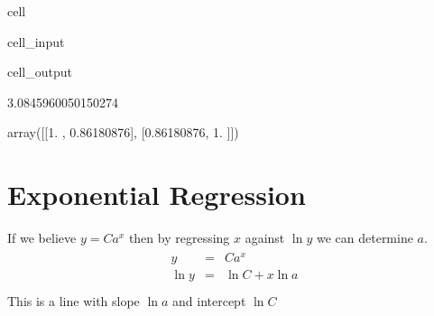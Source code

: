 \documentclass[letterpaper,10pt,english]{jupyterBook}
\begin{document}
\begin{sphinxuseclass}{cell}\begin{sphinxVerbatimInput}

\begin{sphinxuseclass}{cell_input}
\begin{sphinxVerbatim}[commandchars=\\\{\}]
\end{sphinxVerbatim}

\end{sphinxuseclass}\end{sphinxVerbatimInput}
\begin{sphinxVerbatimOutput}

\begin{sphinxuseclass}{cell_output}
\begin{sphinxVerbatim}[commandchars=\\\{\}]
3.0845960050150274
\end{sphinxVerbatim}

\begin{sphinxVerbatim}[commandchars=\\\{\}]
array([[1.        , 0.86180876],
       [0.86180876, 1.        ]])
\end{sphinxVerbatim}

\end{sphinxuseclass}\end{sphinxVerbatimOutput}

\end{sphinxuseclass}

\section{Exponential Regression}
\label{\detokenize{lessons/LogLogRegression:exponential-regression}}
\sphinxAtStartPar
If we believe \(y = Ca^x\) then by regressing \(x\) against \(\ln y\) we can determine \(a\).
\begin{equation*}
\begin{split}
\begin{array}{rl}
y &=& Ca^x \\
\ln y &=& \ln C + x \ln a \\
\end{array}
\end{split}
\end{equation*}
\sphinxAtStartPar
This is a line with slope \(\ln a\) and intercept \(\ln C\)
\end{document}
